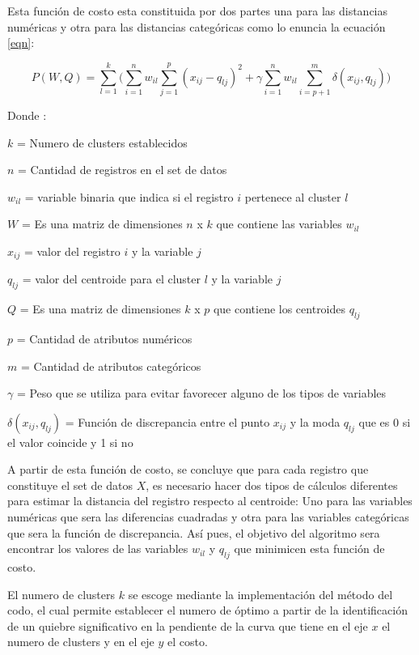  \medbreak

Esta función de costo esta constituida por dos partes una para las distancias numéricas y otra para las distancias categóricas como lo enuncia la ecuación \ref{eqn}:

\begin{equation} \label{eqn}
	P(W, Q) =  \sum_{l=1}^{k} \bigg(\sum_{i=1}^{n} w_{il} \sum_{j=1}^{p} (x_{ij} - q_{lj})^2 + \gamma\sum_{i=1}^{n} w_{il}  \sum_{i=p+1}^{m}\delta(x_{ij} , q_{lj})\bigg)
\end{equation}

Donde :

$k$  = Numero de clusters establecidos

$n$  = Cantidad de registros en el set de datos

$w_{il}$  = variable binaria que indica si el registro $i$  pertenece al cluster $l$ 

$W$  = Es una matriz de dimensiones $n$ x $k$ que contiene las variables $w_{il}$ 

$x_{ij}$ = valor del registro $i$  y la variable $j$ 

$q_{lj}$  = valor del centroide para el cluster $l$  y la variable $j$

$Q$  = Es una matriz de dimensiones $k$ x $p$ que contiene los centroides $q_{lj}$

$p$  = Cantidad de atributos numéricos

$m$  = Cantidad de atributos categóricos

$\gamma$  = Peso que se utiliza para evitar favorecer alguno de los tipos de variables

$\delta(x_{ij} , q_{lj})$  = Función de discrepancia entre el punto $x_{ij}$ y la moda $q_{lj}$ que es 0 si el valor coincide y 1 si no 

 \medbreak

A partir de esta función de costo, se concluye que para cada registro que constituye el set de datos $X$, es necesario hacer dos tipos de cálculos diferentes para estimar la distancia del registro respecto al centroide: Uno para las variables numéricas que sera las diferencias cuadradas y otra para las variables categóricas que sera la función de discrepancia. Así pues, el objetivo del algoritmo sera encontrar los valores de las variables $w_{il}$  y $q_{lj}$ que minimicen esta función de costo.

 \medbreak

El numero de clusters $k$  se escoge mediante la implementación del método del codo, el cual permite establecer el numero de óptimo a partir de la identificación de un quiebre significativo en la pendiente de la curva que tiene en el eje $x$  el numero de clusters y en el eje $y$  el costo.


